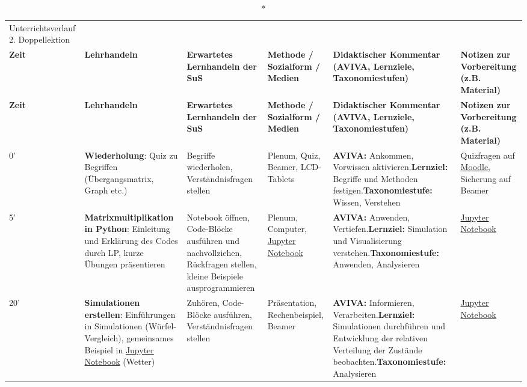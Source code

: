 \begin{landscape}
        \begin{longtable}{@{}l|p{5cm}|p{5cm}|p{4cm}|p{5cm}|p{5cm}@{}}
            \caption*{Unterrichtsverlauf 2. Doppellektion}\\
            \textbf{Zeit} & \textbf{Lehrhandeln} & \textbf{Erwartetes Lernhandeln der SuS} & \textbf{Methode / Sozialform / Medien} & \textbf{Didaktischer Kommentar (AVIVA, Lernziele, Taxonomiestufen)} & \textbf{Notizen zur Vorbereitung (z.B. Material)} \\\midrule\midrule
            \endfirsthead
            \textbf{Zeit} & \textbf{Lehrhandeln} & \textbf{Erwartetes Lernhandeln der SuS} & \textbf{Methode / Sozialform / Medien} & \textbf{Didaktischer Kommentar (AVIVA, Lernziele, Taxonomiestufen)} & \textbf{Notizen zur Vorbereitung (z.B. Material)} \\\midrule\midrule
            \endhead

            0'  & \textbf{Wiederholung}: Quiz zu Begriffen (Übergangsmatrix, Graph etc.) & Begriffe wiederholen, Verständnisfragen stellen & Plenum, Quiz, Beamer, LCD-Tablets & \textbf{AVIVA:} Ankommen, Vorwissen aktivieren.\newline\textbf{Lernziel:} Begriffe und Methoden festigen.\newline\textbf{Taxonomiestufe:} Wissen, Verstehen & Quizfragen auf \href{https://moodle.kzn.ch}{Moodle}, Sicherung auf Beamer \\\midrule

            5'  & \textbf{Matrixmultiplikation in Python}: Einleitung und Erklärung des Codes durch LP, kurze Übungen präsentieren & Notebook öffnen, Code-Blöcke ausführen und nachvollziehen, Rückfragen stellen, kleine Beispiele ausprogrammieren & Plenum, Computer, \href{https://cyrilblum.github.io/datascience-jupyter/lab/index.html}{Jupyter Notebook} & \textbf{AVIVA:} Anwenden, Vertiefen.\newline\textbf{Lernziel:} Simulation und Visualisierung verstehen.\newline\textbf{Taxonomiestufe:} Anwenden, Analysieren & \href{https://cyrilblum.github.io/datascience-jupyter/lab/index.html}{Jupyter Notebook} \\\midrule

            20' & \textbf{Simulationen erstellen}: Einführungen in Simulationen (Würfel-Vergleich), gemeinsames Beispiel in \href{https://cyrilblum.github.io/datascience-jupyter/lab/index.html}{Jupyter Notebook} (Wetter) & Zuhören, Code-Blöcke ausführen, Verständnisfragen stellen & Präsentation, Rechenbeispiel, Beamer & \textbf{AVIVA:} Informieren, Verarbeiten.\newline\textbf{Lernziel:} Simulationen durchführen und Entwicklung der relativen Verteilung der Zustände beobachten.\newline\textbf{Taxonomiestufe:} Analysieren & \href{https://cyrilblum.github.io/datascience-jupyter/lab/index.html}{Jupyter Notebook} \\\midrule


\end{longtable}
\end{landscape}
